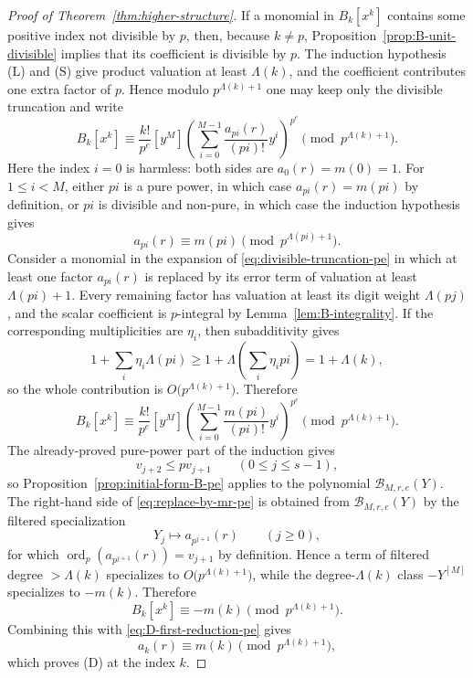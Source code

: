 \documentclass[11pt]{amsart}
\numberwithin{equation}{section}
\DeclareMathOperator{\ordop}{ord}
\newcommand{\bigo}{O}
\newcommand{\vp}{\ordop_p}
\begin{document}
\begin{proof}[Proof of Theorem~\ref{thm:higher-structure}]
If a monomial in $B_k[x^k]$ contains some positive index not divisible by $p$, then, because $k\ne p$, Proposition~\ref{prop:B-unit-divisible} implies that its coefficient is divisible by $p$.  The induction hypothesis (L) and (S) give product valuation at least $\Lambda(k)$, and the coefficient contributes one extra factor of $p$.  Hence modulo $p^{\Lambda(k)+1}$ one may keep only the divisible truncation and write
\begin{equation}\label{eq:divisible-truncation-pe}
        B_k[x^k]\equiv
        \frac{k!}{p^e}[y^M]\left(\sum_{i=0}^{M-1}\frac{a_{pi}(r)}{(pi)!}y^i\right)^{p^e}
        \pmod{p^{\Lambda(k)+1}}.
\end{equation}
Here the index $i=0$ is harmless: both sides are $a_0(r)=m(0)=1$.  For $1\le i<M$, either $pi$ is a pure power, in which case $a_{pi}(r)=m(pi)$ by definition, or $pi$ is divisible and non-pure, in which case the induction hypothesis gives
\[
        a_{pi}(r)\equiv m(pi)\pmod{p^{\Lambda(pi)+1}}.
\]
Consider a monomial in the expansion of \eqref{eq:divisible-truncation-pe} in which at least one factor $a_{pi}(r)$ is replaced by its error term of valuation at least $\Lambda(pi)+1$.  Every remaining factor has valuation at least its digit weight $\Lambda(pj)$, and the scalar coefficient is $p$-integral by Lemma~\ref{lem:B-integrality}.  If the corresponding multiplicities are $\eta_i$, then subadditivity gives
\[
        1+\sum_i \eta_i\Lambda(pi)\ge 1+\Lambda\!\left(\sum_i \eta_i pi\right)=1+\Lambda(k),
\]
so the whole contribution is $\bigo\bigl(p^{\Lambda(k)+1}\bigr)$.  Therefore
\begin{equation}\label{eq:replace-by-mr-pe}
        B_k[x^k]\equiv
        \frac{k!}{p^e}[y^M]\left(\sum_{i=0}^{M-1}\frac{m(pi)}{(pi)!}y^i\right)^{p^e}
        \pmod{p^{\Lambda(k)+1}}.
\end{equation}
The already-proved pure-power part of the induction gives
\[
        v_{j+2}\le pv_{j+1}
        \qquad (0\le j\le s-1),
\]
so Proposition~\ref{prop:initial-form-B-pe} applies to the polynomial $\mathcal B_{M,r,e}(Y)$.  The right-hand side of \eqref{eq:replace-by-mr-pe} is obtained from $\mathcal B_{M,r,e}(Y)$ by the filtered specialization
\[
        Y_j\longmapsto a_{p^{j+1}}(r)
        \qquad (j\ge0),
\]
for which $\vp(a_{p^{j+1}}(r))=v_{j+1}$ by definition.  Hence a term of filtered degree $>\Lambda(k)$ specializes to $\bigo\bigl(p^{\Lambda(k)+1}\bigr)$, while the degree-$\Lambda(k)$ class $-Y^{[M]}$ specializes to $-m(k)$.  Therefore
\[
        B_k[x^k]\equiv -m(k)\pmod{p^{\Lambda(k)+1}}.
\]
Combining this with \eqref{eq:D-first-reduction-pe} gives
\[
        a_k(r)\equiv m(k)\pmod{p^{\Lambda(k)+1}},
\]
which proves (D) at the index $k$.


\end{proof}
\end{document}
